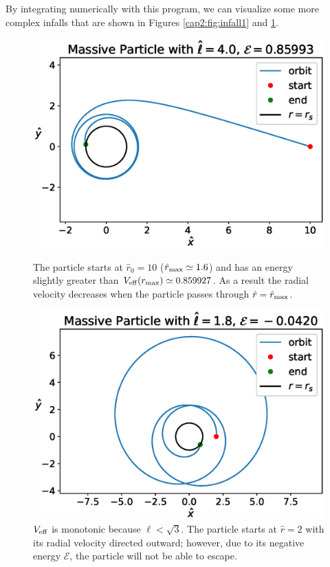 By integrating numerically with this program, we can visualize some more
complex infalls that are shown in Figures \ref{cap2:fig:infall1} and
\ref{cap2:fig:infall2}.

\begin{figure}[h]
    \begin{minipage}{0.48\textwidth}
        \centering
        \includegraphics[width=\textwidth]{Figures/chapter2/infall1.eps}
        \caption{The particle starts at $\hat r_0 = 10$
        ($\hat r_{\rm max} \simeq 1.6$) and has an energy slightly greater than
        $V_{\rm eff}(r_{\rm max}) \simeq 0.859927$.
        As a result the radial velocity decreases when the particle passes
        through $\hat r = \hat r_{\rm max}$.}
        \label{cap2:fig:infall1}
    \end{minipage}
    \hspace{0.015 \textwidth}
    \begin{minipage}{0.48\textwidth}
        \centering
        \includegraphics[width=\textwidth]{Figures/chapter2/infall2.eps}
        \caption{$V_{\rm eff}$ is monotonic because $\ell < \sqrt{3}$.
        The particle starts at $\hat r = 2$ with its radial velocity
        directed outward; however, due to its negative energy $\mathcal E$, the
        particle will not be able to escape.}
        \label{cap2:fig:infall2}
    \end{minipage}
\end{figure}


